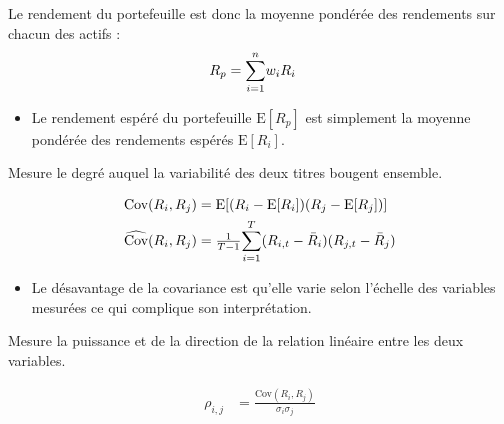 \documentclass[10pt, french]{article}
\begin{document}
\begin{multicols*}{2}
Le rendement du portefeuille est donc la moyenne pondérée des rendements sur chacun des actifs :
\begin{align*}
	R_{p}
	&=	\overset{n}{\underset{i	=	1}{\sum}} w_{i} R_{i}
\end{align*}
\begin{itemize}
	\item	Le rendement espéré du portefeuille $\text{E}[R_{p}]$ est simplement la moyenne pondérée des rendements espérés $\text{E}[R_{i}]$.
\end{itemize}

\begin{definitionNOHFILL}[Covariance]
Mesure le degré auquel la variabilité des deux titres bougent ensemble.

\begin{align*}
	\text{Cov}(R_{i}, R_{j})
	&=	\text{E}[(R_{i}	-	\text{E}[R_{i}])(R_{j}	-	\text{E}[R_{j}])]	\\
	\widehat{\text{Cov}}	(R_{i}, R_{j})
	&=	\tfrac{1}{T	-	1} \overset{T}{\underset{i	=	1}{\sum}} (R_{i, t}	-	\bar{R}_{i})(R_{j, t}	-	\bar{R}_{j})	\\
\end{align*}

\tcbline

\begin{itemize}
	\item	Le désavantage de la covariance est qu'elle varie selon l'échelle des variables mesurées ce qui complique son interprétation.
\end{itemize}
\end{definitionNOHFILL}

\begin{definitionNOHFILL}[Corrélation]
Mesure la puissance et de la direction de la relation linéaire entre les deux variables.

\begin{align*}
	\rho_{i, j}
	&=	\frac{\text{Cov}	(R_{i}, R_{j})}{\sigma_{i}\sigma_{j}}
\end{align*}

\begin{center}

\end{center}
\end{definitionNOHFILL}
\end{multicols*}
\end{document}
